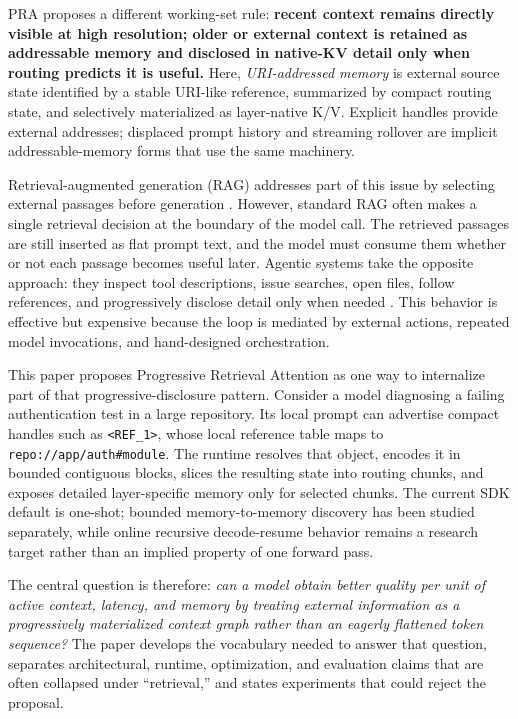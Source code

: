 \documentclass[11pt]{article}
\begin{document}
PRA proposes a different working-set rule: \textbf{recent context remains directly visible
at high resolution; older or external context is retained as addressable memory and
disclosed in native-KV detail only when routing predicts it is useful.} Here,
\emph{URI-addressed memory} is external source state identified by a stable URI-like
reference, summarized by compact routing state, and selectively materialized as
layer-native K/V. Explicit handles provide external addresses; displaced prompt history
and streaming rollover are implicit addressable-memory forms that use the same machinery.

Retrieval-augmented generation (RAG) addresses part of this issue by selecting external passages before generation \cite{lewis2020rag,guu2020realm,karpukhin2020dpr}. However, standard RAG often makes a single retrieval decision at the boundary of the model call. The retrieved passages are still inserted as flat prompt text, and the model must consume them whether or not each passage becomes useful later. Agentic systems take the opposite approach: they inspect tool descriptions, issue searches, open files, follow references, and progressively disclose detail only when needed \cite{yao2023react,schick2023toolformer}. This behavior is effective but expensive because the loop is mediated by external actions, repeated model invocations, and hand-designed orchestration.

This paper proposes Progressive Retrieval Attention as one way to internalize part of that progressive-disclosure pattern.  Consider a model diagnosing a failing authentication test in a large repository.  Its local prompt can advertise compact handles such as \texttt{<REF\_1>}, whose local reference table maps to \texttt{repo://app/auth\#module}.  The runtime resolves that object, encodes it in bounded contiguous blocks, slices the resulting state into routing chunks, and exposes detailed layer-specific memory only for selected chunks.  The current SDK default is one-shot; bounded memory-to-memory discovery has been studied separately, while online recursive decode-resume behavior remains a research target rather than an implied property of one forward pass.

The central question is therefore: \emph{can a model obtain better quality per unit of active context, latency, and memory by treating external information as a progressively materialized context graph rather than an eagerly flattened token sequence?}  The paper develops the vocabulary needed to answer that question, separates architectural, runtime, optimization, and evaluation claims that are often collapsed under ``retrieval,'' and states experiments that could reject the proposal.
\end{document}
